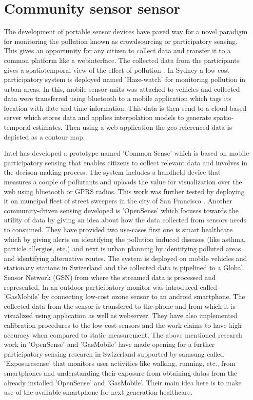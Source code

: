 \section{Community sensor sensor}

The development of portable sensor devices have paved way for a novel paradigm for monitoring the pollution known as crowdsourcing or participatory sensing. This gives an opportunity for any citizen to collect data and transfer it to a common platform like a webinterface. The collected data  from the participants gives a spatiotemporal view of the effect of pollution \cite{Kanhere2013}. In Sydney a low cost participatory system is deployed named 'Haze-watch' \cite{Sivaraman2013} for monitoring pollution in urban areas. In this, mobile sensor units was attached to vehicles and collected data were transferred using bluetooth to a mobile application which tags its location with date and time information. This data is then send to a cloud-based server which stores data and applies interpolation models \cite{Liao2006} to generate spatio-temporal estimates. Then using a web application the geo-referenced data is depicted as a contour map. 
\par
Intel has developed a prototype named 'Common Sense' \cite{Dutta2009} which is based on mobile participatory sensing \cite{Abdelzaher2007} that enables citizens to collect relevant data and involves in the decison making process. The system includes a handheld device that measures a couple of pollutants and uploads the value for visualization over the web using bluetooth or GPRS radios. This work was further tested by deploying it on muncipal fleet of street sweepers in the city of San Francisco \cite{Aoki2008}. Another community-driven sensing developed is 'OpenSense' \cite{Aberer2010} which focuses towards the utility of data by giving an idea about how the data collected from sensors needs to consumed. They have provided two use-cases first one is smart healthcare which by giving alerts on identifying the pollution induced diseases (like asthma, particle allergies, etc.) and next is urban planning by identifying polluted areas and identifying alternative routes. The system is deployed on mobile vehicles and stationary stations in Swizerland and the collected data is pipelined to a Global Sensor Network (GSN) from where the streamed data is processed and represented. In \cite{Hasenfratz2012} an outdoor participatory monitor was introduced called 'GasMobile' by connecting low-cost ozone sensor to an android smartphone. The collected data from the sensor is transfered to the phone and from which it is visualized using application as well as webserver. They have also implemented calibration procedures to the low cost sensors and the work claims to have high accuracy when compared to static measurement. The above mentioned research work in 'OpenSense' and 'GasMobile' have made opening for a further participatory sensing research in Swizerland supported by samsung called 'Exposuresense' \cite{Predic2013} that monitors user activities like walking, running, etc., from smartphones and understanding their exposure from obtaining datas from the already installed 'OpenSense' and 'GasMobile'. Their main idea here is to make use of the available smartphone for next generation healthcare.
